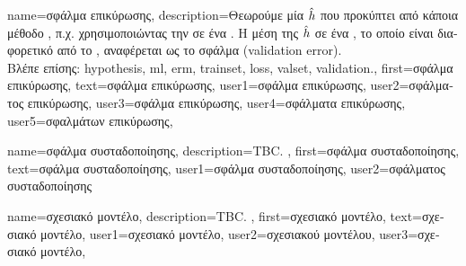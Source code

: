 {name={\foreignlanguage{greek}{σφάλμα επικύρωσης}},
	description={\foreignlanguage{greek}{Θεωρούμε μία}  $\hat{h}$ 
		\foreignlanguage{greek}{που προκύπτει από κάποια μέθοδο} , \foreignlanguage{greek}{π.χ. χρησιμοποιώντας την} 
		 \foreignlanguage{greek}{σε ένα} . \foreignlanguage{greek}{Η μέση}  
		\foreignlanguage{greek}{της} $\hat{h}$ \foreignlanguage{greek}{σε ένα} , \foreignlanguage{greek}{το οποίο είναι 
		διαφορετικό από το} , \foreignlanguage{greek}{αναφέρεται ως το σφάλμα}  (validation error).
		\\
		\foreignlanguage{greek}{Βλέπε επίσης:} \gls{hypothesis}, \gls{ml}, \gls{erm}, \gls{trainset}, \gls{loss}, \gls{valset}, \gls{validation}.},
	first={\foreignlanguage{greek}{σφάλμα επικύρωσης}},
	text={\foreignlanguage{greek}{σφάλμα επικύρωσης}},
	user1={\foreignlanguage{greek}{σφάλμα επικύρωσης}}, %
	user2={\foreignlanguage{greek}{σφάλματος επικύρωσης}}, %
	user3={\foreignlanguage{greek}{σφάλμα επικύρωσης}}, %
	user4={\foreignlanguage{greek}{σφάλματα επικύρωσης}}, %
	user5={\foreignlanguage{greek}{σφαλμάτων επικύρωσης}}, %
}

{name={\foreignlanguage{greek}{σφάλμα συσταδοποίησης}}, 
	description={TBC. }, 
	first={\foreignlanguage{greek}{σφάλμα συσταδοποίησης}},
	text={\foreignlanguage{greek}{σφάλμα συσταδοποίησης}},
	user1={\foreignlanguage{greek}{σφάλμα συσταδοποίησης}},
	user2={\foreignlanguage{greek}{σφάλματος συσταδοποίησης}}
}

{name={\foreignlanguage{greek}{σχεσιακό μοντέλο}},
	description={TBC. }, 
	first={\foreignlanguage{greek}{σχεσιακό μοντέλο}},
	text={\foreignlanguage{greek}{σχεσιακό μοντέλο}},
	user1={\foreignlanguage{greek}{σχεσιακό μοντέλο}}, %
	user2={\foreignlanguage{greek}{σχεσιακού μοντέλου}}, %
	user3={\foreignlanguage{greek}{σχεσιακό μοντέλο}}, %
}

